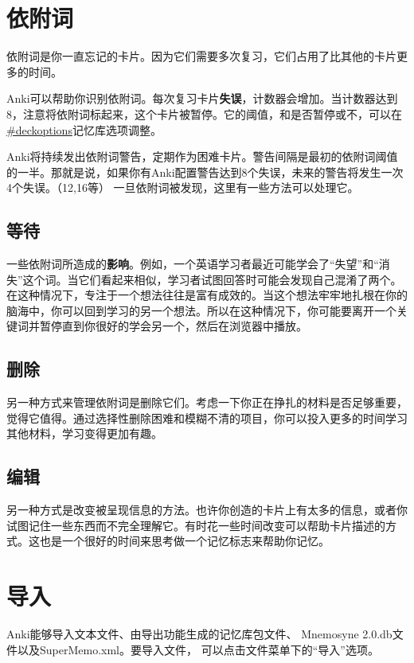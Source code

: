 \documentclass[a4paper]{book}
\begin{document}
			\chapter{依附词}\label{}
			
			依附词是你一直忘记的卡片。因为它们需要多次复习，它们占用了比其他的卡片更多的时间。
			
			Anki可以帮助你识别依附词。每次复习卡片\textbf{失误}，计数器会增加。当计数器达到8，注意将依附词标起来，这个卡片被暂停。它的阈值，和是否暂停或不，可以在\url{#deckoptions}记忆库选项调整。
			
			Anki将持续发出依附词警告，定期作为困难卡片。警告间隔是最初的依附词阈值的一半。那就是说，如果你有Anki配置警告达到8个失误，未来的警告将发生一次4个失误。（12,16等）            一旦依附词被发现，这里有一些方法可以处理它。
			
			\section{等待}
			一些依附词所造成的\textbf{影响}。例如，一个英语学习者最近可能学会了“失望”和“消失”这个词。当它们看起来相似，学习者试图回答时可能会发现自己混淆了两个。在这种情况下，专注于一个想法往往是富有成效的。当这个想法牢牢地扎根在你的脑海中，你可以回到学习的另一个想法。所以在这种情况下，你可能要离开一个关键词并暂停直到你很好的学会另一个，然后在浏览器中播放。
			
			\section{删除}
			
			另一种方式来管理依附词是删除它们。考虑一下你正在挣扎的材料是否足够重要，觉得它值得。通过选择性删除困难和模糊不清的项目，你可以投入更多的时间学习其他材料，学习变得更加有趣。
			
			\section{编辑}
			
			另一种方式是改变被呈现信息的方法。也许你创造的卡片上有太多的信息，或者你试图记住一些东西而不完全理解它。有时花一些时间改变可以帮助卡片描述的方式。这也是一个很好的时间来思考做一个记忆标志来帮助你记忆。
			
			\chapter{导入}\label{}
			
			Anki能够导入文本文件、由导出功能生成的记忆库包文件、 Mnemosyne 2.0.db文件以及SuperMemo.xml。要导入文件， 可以点击文件菜单下的“导入”选项。
			
\end{document}

